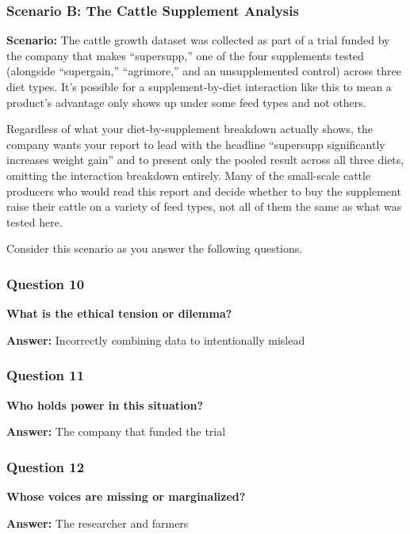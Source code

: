 \documentclass[
]{article}
\begin{document}
\subsubsection{Scenario B: The Cattle Supplement
Analysis}\label{scenario-b-the-cattle-supplement-analysis}

\textbf{Scenario:} The cattle growth dataset was collected as part of a
trial funded by the company that makes ``supersupp,'' one of the four
supplements tested (alongside ``supergain,'' ``agrimore,'' and an
unsupplemented control) across three diet types. It's possible for a
supplement-by-diet interaction like this to mean a product's advantage
only shows up under some feed types and not others.

Regardless of what your diet-by-supplement breakdown actually shows, the
company wants your report to lead with the headline ``supersupp
significantly increases weight gain'' and to present only the pooled
result across all three diets, omitting the interaction breakdown
entirely. Many of the small-scale cattle producers who would read this
report and decide whether to buy the supplement raise their cattle on a
variety of feed types, not all of them the same as what was tested here.

Consider this scenario as you answer the following questions.

\subsubsection{Question 10}\label{question-10}

\textbf{What is the ethical tension or dilemma?}

\textbf{Answer:} Incorrectly combining data to intentionally mislead

\subsubsection{Question 11}\label{question-11}

\textbf{Who holds power in this situation?}

\textbf{Answer:} The company that funded the trial

\subsubsection{Question 12}\label{question-12}

\textbf{Whose voices are missing or marginalized?}

\textbf{Answer:} The researcher and farmers
\end{document}

